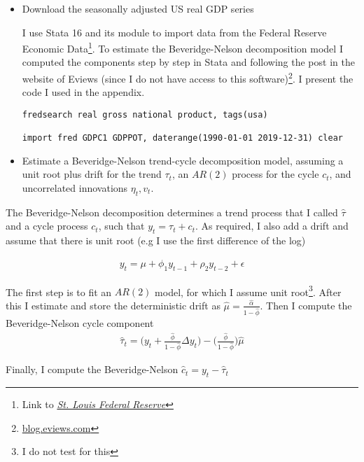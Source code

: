 \documentclass[11pt]{article}
\begin{document}
\begin{itemize}
\item Download the seasonally adjusted US real GDP series

I use Stata 16 and its module to import data from the Federal Reserve Economic Data\footnote{Link to \href{https://www.stata.com/features/overview/import-fred/}{\textit{ St. Louis Federal Reserve}}}. To estimate the Beveridge-Nelson decomposition model I computed the components step by step in Stata and following the post in the website of Eviews (since I do not have access to this software)\footnote{\href{http://blog.eviews.com/2020/02/beveridge-nelson-filter.html}{blog.eviews.com}}. I present the code I used in the appendix. 

\begin{verbatim}
fredsearch real gross national product, tags(usa)  

import fred GDPC1 GDPPOT, daterange(1990-01-01 2019-12-31) clear
\end{verbatim}
    \item Estimate a Beveridge-Nelson trend-cycle decomposition model, assuming a unit root plus drift for the trend $\tau_t$, an $AR(2)$ process for the cycle $c_t$, and uncorrelated innovations $\eta_t, v_t$.
\end{itemize}
      
The Beveridge-Nelson decomposition determines a trend process that I called $\hat{\tau}$ and a cycle process $c_t$, such that $y_t= \tau_t+c_t$. As required, I also add a drift and assume that there is unit root (e.g I use the first difference of the log)

\begin{align*}
    y_{t} = \mu + \phi_1 y_{t-1} +\rho_2 y_{t-2} + \epsilon
\end{align*}

The first step is to fit an $AR(2)$ model, for which I assume unit root\footnote{I do not test for this}. After this I estimate and store the deterministic drift as $\hat{\mu} = \frac{\hat{\alpha}}{1-\hat{\phi}} $. Then I compute the Beveridge-Nelson cycle component \\
\begin{align*}
    \hat{\tau}_t =\Big(  y_{t} + \frac{\hat{\phi}}{1-\hat{\phi}} \Delta y_t \Big) - \Big( \frac{\hat{\phi}}{1- \hat{\phi}}\Big) \hat{\mu}
\end{align*}

Finally, I compute the Beveridge-Nelson $\hat{c}_t = y_t -  \hat{\tau}_t$
\end{document}
